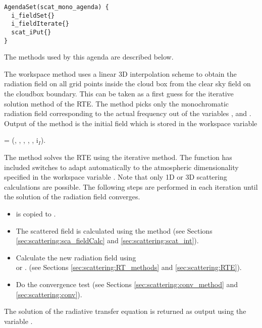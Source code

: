 \begin{verbatim}
AgendaSet(scat_mono_agenda) {
  i_fieldSet{}
  i_fieldIterate{}
  scat_iPut{}
}
\end{verbatim}

\noindent
The methods used by this agenda are described below.

 
The workspace method  
uses a linear 3D interpolation scheme to obtain the 
radiation field on all grid points inside the cloud box from the clear
sky field on the cloudbox boundary.
This can be taken as a first guess for the iterative solution method
of the RTE.  The method picks only the monochromatic radiation field
corresponding to the actual frequency out of the variables
,  and
. Output of the method is the initial field 
which is stored in the workspace variable
\begin{center}
  =  (\Prs, \Lat, \Lon, \ScaZa,
\ScaAa, i$_I$). 
\end{center}


The method  solves the RTE using the
iterative method.  The function has
included switches to adapt automatically to the atmospheric
dimensionality specified
in the workspace variable . Note that only
1D or 3D scattering calculations are possible. 
The following steps are performed in each iteration until the solution
of the radiation field converges.

\begin{itemize}
\item {} is copied to .
\item The scattered field is calculated using the method
    (see Sections \ref{sec:scattering:sca_fieldCalc} and
    \ref{sec:scattering:scat_int}).
\item Calculate the new radiation field using\\
   or .
 (see Sections \ref{sec:scattering:RT_methods} and
  \ref{sec:scattering:RTE}).
\item Do the convergence test (see Sections
  \ref{sec:scattering:conv_method} and \ref{sec:scattering:conv}).
\end{itemize}
The solution of the radiative transfer equation is returned as output
using the variable . 

